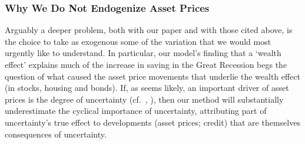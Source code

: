 \begin{comment}



When a novel approach to a question is proposed, it is almost always best to illustrate the technique with the simplest possible framework, rather than the richest possible framework, so that the essentials of the methodological contribution are easier to absorb.  It will always be possible for subsequent researchers to see whether the results obtained using a simple model hold up when the model is made more realistic.
\end{comment}


\hypertarget{Why-We-Do-Not-Endogenize-Asset-Prices}{}

\subsubsection{Why We Do Not Endogenize Asset Prices}{}

Arguably a deeper problem, both with our paper and with those cited above, is the choice to take as exogenous some of the variation that we would most urgently like to understand.  In particular, our model's finding that a `wealth effect' explains much of the increase in saving in the Great Recession begs the question of what caused the asset price movements that underlie the wealth effect (in stocks, housing and bonds). If, as seems likely, an important driver of asset prices is the degree of uncertainty (cf.\ \cite{bexUncertaintyAssetPrices}, \cite{drechslerUncertainty}), then our method will substantially underestimate the cyclical importance of uncertainty, attributing part of uncertainty's true effect to developments (asset prices; credit) that are themselves consequences of uncertainty.

